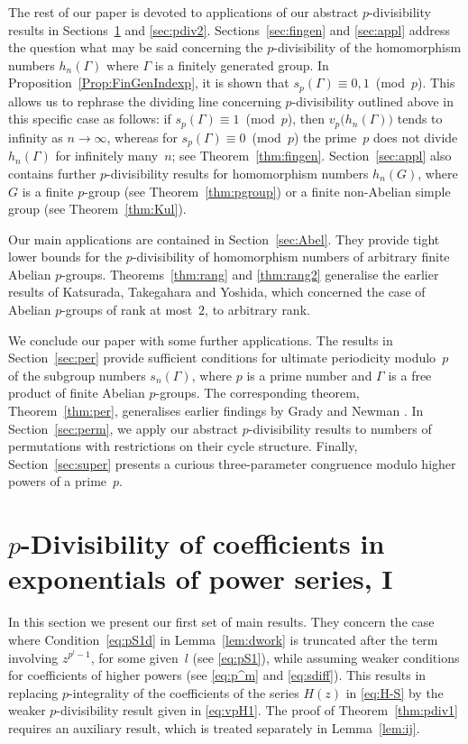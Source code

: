 \documentclass[12pt,reqno]{amsart}
\numberwithin{equation}{section}
\theoremstyle{remark}
\begin{document}
The rest of our paper is devoted to applications of our abstract 
$p$-divisibility results in Sections~\ref{sec:pdiv1} and \ref{sec:pdiv2}. 
Sections~\ref{sec:fingen} and \ref{sec:appl} 
address the question what may be said concerning the
$p$-divisibility of the homomorphism numbers $h_n(\Gamma)$ where
$\Gamma$ is a finitely generated group. 
In Proposition~\ref{Prop:FinGenIndexp}, it is shown that
$s_p(\Gamma)\equiv 0,1$~(mod~$p$). This allows us to rephrase
the dividing line concerning $p$-divisibility outlined above 
in this specific case as follows: if 
$s_p(\Gamma)\equiv 1$~(mod~$p$), then $v_p\big(h_n(\Gamma)\big)$
tends to infinity as $n\to\infty$, whereas for
$s_p(\Gamma)\equiv 0$~(mod~$p$) the prime~$p$ does not divide 
$h_n(\Gamma)$ for infinitely many~$n$; see Theorem~\ref{thm:fingen}.
Section~\ref{sec:appl} also contains further $p$-divisibility results
for homomorphism numbers $h_n(G)$, where $G$ is a finite $p$-group
(see Theorem~\ref{thm:pgroup}) or a finite non-Abelian simple group (see
Theorem~\ref{thm:Kul}). 

Our main applications are contained in Section~\ref{sec:Abel}. They
provide tight lower bounds for the $p$-divisibility of
homomorphism numbers of arbitrary finite Abelian $p$-groups.
Theorems~\ref{thm:rang} and \ref{thm:rang2} generalise
the earlier results of Katsurada, Takegahara and Yoshida, which
concerned the case of Abelian $p$-groups of rank at most~$2$, to
arbitrary rank.

We conclude our paper with some further applications.
The results in Section~\ref{sec:per} provide sufficient conditions
for ultimate periodicity modulo~$p$ 
of the subgroup numbers $s_n(\Gamma)$, where $p$ is a prime number and
$\Gamma$ is a free product of finite Abelian $p$-groups.
The corresponding theorem, Theorem~\ref{thm:per},
generalises earlier findings by Grady and Newman \cite{GrNeAA}.
In Section~\ref{sec:perm}, we apply our abstract $p$-divisibility
results to numbers of permutations with restrictions on their
cycle structure. Finally, Section~\ref{sec:super} presents a
curious three-parameter congruence modulo higher powers of
a prime~$p$.

\section{$p$-Divisibility of coefficients in exponentials of
  power series, I} \label{sec:pdiv1}

\noindent In this section we present our first set of 
main results. They concern the case where Condition~\eqref{eq:pS1d} in
Lemma~\ref{lem:dwork} is truncated after the term
involving $z^{p^l-1}$, 
for some given~$l$ (see \eqref{eq:pS1}), while assuming weaker
conditions 
for coefficients of higher powers  
(see \eqref{eq:p^m} and \eqref{eq:sdiff}). This results in 
replacing $p$-integrality of the coefficients of the series $H(z)$ in
\eqref{eq:H-S} by the weaker $p$-divisibility result given in
\eqref{eq:vpH1}. The proof of Theorem~\ref{thm:pdiv1} 
requires an auxiliary result, which is treated separately in
Lemma~\ref{lem:ij}.  
\end{document}

